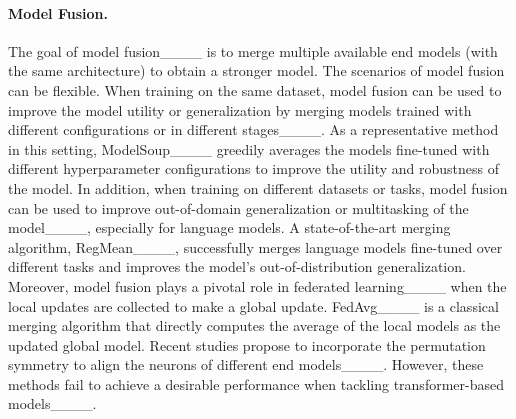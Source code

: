 \paragraph{Model Fusion.}
The goal of model fusion____ is to merge multiple available end models (with the same architecture) to obtain a stronger model.
The scenarios of model fusion can be flexible.
When training on the same dataset, model fusion can be used to improve the model utility or generalization by merging models trained with different configurations or in different stages____.
As a representative method in this setting, ModelSoup____ greedily averages the models fine-tuned with different hyperparameter configurations to improve the utility and robustness of the model.
In addition, when training on different datasets or tasks, model fusion can be used to improve out-of-domain generalization or multitasking of the model____, especially for language models.
A state-of-the-art merging algorithm, RegMean____, successfully merges language models fine-tuned over different tasks and improves the model's out-of-distribution generalization.
Moreover, model fusion plays a pivotal role in federated learning____ when the local updates are collected to make a global update.
FedAvg____ is a classical merging algorithm that directly computes the average of the local models as the updated global model.
Recent studies propose to incorporate the permutation symmetry to align the neurons of different end models____.
However, these methods fail to achieve a desirable performance when tackling transformer-based models____.